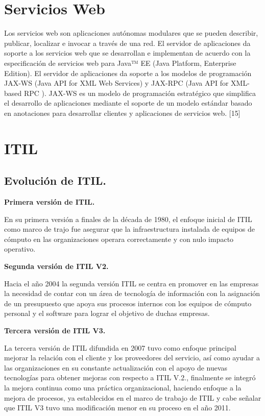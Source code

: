  \section{Servicios Web}
 Los servicios web son aplicaciones autónomas modulares que se pueden describir, publicar, localizar e invocar a través de una red.
 El servidor de aplicaciones da soporte a los servicios web que se desarrollan e implementan de acuerdo con la especificación de servicios web para Java™ EE (Java Platform, Enterprise Edition). El servidor de aplicaciones da soporte a los modelos de programación JAX-WS (Java API for XML Web Services) y JAX-RPC (Java API for XML-based RPC ). JAX-WS es un modelo de programación estratégico que simplifica el desarrollo de aplicaciones mediante el soporte de un modelo estándar basado en anotaciones para desarrollar clientes y aplicaciones de servicios web. [15]
 
 \section{ ITIL }
 
 \subsection{Evolución de ITIL.}
\textbf{Primera versión de ITIL.}

 En su primera versión a finales de la década de 1980, el enfoque inicial de ITIL como marco de trajo fue asegurar que la infraestructura instalada de equipos de cómputo en las organizaciones operara correctamente y con nulo impacto operativo.
 
\textbf{Segunda versión de ITIL V2.}

 Hacia el año 2004 la segunda versión ITIL se centra en promover en las empresas la necesidad de contar con un área de tecnología de información con la asignación de un presupuesto que apoya sus procesos internos con los equipos de cómputo personal y el software para lograr el objetivo de duchas empresas.
 
\textbf{Tercera versión de ITIL V3.}

 La tercera versión de ITIL difundida en 2007 tuvo como enfoque principal mejorar la relación con el cliente y los proveedores del servicio, así como ayudar a las organizaciones en su constante actualización con el apoyo de nuevas tecnologías para obtener mejoras con respecto a ITIL V.2., finalmente se integró la mejora continua como una práctica organizacional, haciendo enfoque a la mejora de procesos, ya establecidos en el marco de trabajo de ITIL y cabe señalar que ITIL V3 tuvo una modificación menor en su proceso en el año 2011.
 
